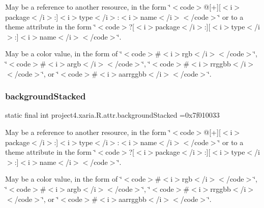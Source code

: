 May be a reference to another resource, in the form \char`\"{}$<$code$>$@\mbox{[}+\mbox{]}\mbox{[}$<$i$>$package$<$/i$>$\+:\mbox{]}$<$i$>$type$<$/i$>$\+:$<$i$>$name$<$/i$>$$<$/code$>$\char`\"{} or to a theme attribute in the form \char`\"{}$<$code$>$?\mbox{[}$<$i$>$package$<$/i$>$\+:\mbox{]}\mbox{[}$<$i$>$type$<$/i$>$\+:\mbox{]}$<$i$>$name$<$/i$>$$<$/code$>$\char`\"{}. 

May be a color value, in the form of \char`\"{}$<$code$>$\#$<$i$>$rgb$<$/i$>$$<$/code$>$\char`\"{}, \char`\"{}$<$code$>$\#$<$i$>$argb$<$/i$>$$<$/code$>$\char`\"{}, \char`\"{}$<$code$>$\#$<$i$>$rrggbb$<$/i$>$$<$/code$>$\char`\"{}, or \char`\"{}$<$code$>$\#$<$i$>$aarrggbb$<$/i$>$$<$/code$>$\char`\"{}. \mbox{\label{classproject4_1_1xaria_1_1R_1_1attr_a70c96990ebbe4cf4f6717710797b8703}} 
\subsubsection{\texorpdfstring{background\+Stacked}{backgroundStacked}}
{\footnotesize\ttfamily static final int project4.\+xaria.\+R.\+attr.\+background\+Stacked =0x7f010033\hspace{0.3cm}{\ttfamily [static]}}

May be a reference to another resource, in the form \char`\"{}$<$code$>$@\mbox{[}+\mbox{]}\mbox{[}$<$i$>$package$<$/i$>$\+:\mbox{]}$<$i$>$type$<$/i$>$\+:$<$i$>$name$<$/i$>$$<$/code$>$\char`\"{} or to a theme attribute in the form \char`\"{}$<$code$>$?\mbox{[}$<$i$>$package$<$/i$>$\+:\mbox{]}\mbox{[}$<$i$>$type$<$/i$>$\+:\mbox{]}$<$i$>$name$<$/i$>$$<$/code$>$\char`\"{}. 

May be a color value, in the form of \char`\"{}$<$code$>$\#$<$i$>$rgb$<$/i$>$$<$/code$>$\char`\"{}, \char`\"{}$<$code$>$\#$<$i$>$argb$<$/i$>$$<$/code$>$\char`\"{}, \char`\"{}$<$code$>$\#$<$i$>$rrggbb$<$/i$>$$<$/code$>$\char`\"{}, or \char`\"{}$<$code$>$\#$<$i$>$aarrggbb$<$/i$>$$<$/code$>$\char`\"{}. \mbox{\label{classproject4_1_1xaria_1_1R_1_1attr_ac740debdf11f54d52dedda24c14beaa3}} 
